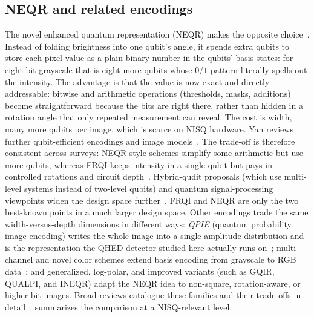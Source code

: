 \subsection{NEQR and related encodings}
The novel enhanced quantum representation (NEQR) makes the opposite choice~\cite{Zhang2013NEQR}. Instead of folding brightness into one qubit's angle, it spends extra qubits to store each pixel value as a plain binary number in the qubits' basis states: for eight-bit grayscale that is eight more qubits whose $0$/$1$ pattern literally spells out the intensity. The advantage is that the value is now exact and directly addressable: bitwise and arithmetic operations (thresholds, masks, additions) become straightforward because the bits are right there, rather than hidden in a rotation angle that only repeated measurement can reveal. The cost is width, many more qubits per image, which is scarce on NISQ hardware. Yan reviews further qubit-efficient encodings and image models~\cite{Yan2014QImageRepresentation}. The trade-off is therefore consistent across surveys: NEQR-style schemes simplify some arithmetic but use more qubits, whereas FRQI keeps intensity in a single qubit but pays in controlled rotations and circuit depth~\cite{Su2020NewTrend,Amankwah2022QPIXL,Das2023HybridQuditRGB}. Hybrid-qudit proposals (which use multi-level systems instead of two-level qubits) and quantum signal-processing viewpoints widen the design space further~\cite{Dutta2021QuantumMechanicsBased,EbrahimpourKomleh2024QuantumComputingImageProcessing}. FRQI and NEQR are only the two best-known points in a much larger design space. Other encodings trade the same width-versus-depth dimensions in different ways: \emph{QPIE} (quantum probability image encoding) writes the whole image into a single amplitude distribution and is the representation the QHED detector studied here actually runs on~\cite{Yao2017QHED}; multi-channel and novel color schemes extend basis encoding from grayscale to RGB data~\cite{Das2023HybridQuditRGB}; and generalized, log-polar, and improved variants (such as GQIR, QUALPI, and INEQR) adapt the NEQR idea to non-square, rotation-aware, or higher-bit images. Broad reviews catalogue these families and their trade-offs in detail~\cite{Yan2014QImageRepresentation,Wang2022ReviewQIP,Su2020NewTrend}.  summarizes the comparison at a NISQ-relevant level.

